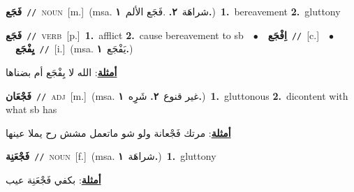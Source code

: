 \documentclass[10pt,a4paper,twoside]{article} %
\begin{document}
\begin{multicols}{2}
{\setlength\topsep{0pt}\textbf{\foreignlanguage{arabic}{فَجَع}}\ {\color{gray}\texttt{//}\color{black}}\ \textsc{noun}\ [m.]\ \color{gray}(msa. \foreignlanguage{arabic}{شراهَة}~\foreignlanguage{arabic}{\textbf{٢.}}  .\foreignlanguage{arabic}{فَجَع الألم}~\foreignlanguage{arabic}{\textbf{١.}})\color{black}\ \textbf{1.}~bereavement  \textbf{2.}~gluttony\ } \vspace{2mm}

{\setlength\topsep{0pt}\textbf{\foreignlanguage{arabic}{فَجَع}}\ {\color{gray}\texttt{//}\color{black}}\ \textsc{verb}\ [p.]\ \textbf{1.}~afflict  \textbf{2.}~cause bereavement to sb\ \ $\bullet$\ \ \setlength\topsep{0pt}\textbf{\foreignlanguage{arabic}{اِفْجَع}}\ {\color{gray}\texttt{//}\color{black}}\ [c.]\ \ $\bullet$\ \ \setlength\topsep{0pt}\textbf{\foreignlanguage{arabic}{يِفْجَع}}\ {\color{gray}\texttt{//}\color{black}}\ [i.]\ \color{gray}(msa. \foreignlanguage{arabic}{يَفْجَع}~\foreignlanguage{arabic}{\textbf{١.}})\color{black}\  \begin{flushright}\color{gray}\foreignlanguage{arabic}{\textbf{\underline{\foreignlanguage{arabic}{أمثلة}}}: الله لا يِفْجَع أم بضناها}\end{flushright}\color{black}} \vspace{2mm}

{\setlength\topsep{0pt}\textbf{\foreignlanguage{arabic}{فَجْعَان}}\ {\color{gray}\texttt{//}\color{black}}\ \textsc{adj}\ [m.]\ \color{gray}(msa. \foreignlanguage{arabic}{غير قنوع}~\foreignlanguage{arabic}{\textbf{٢.}}  \foreignlanguage{arabic}{شَرِِه}~\foreignlanguage{arabic}{\textbf{١.}})\color{black}\ \textbf{1.}~gluttonous  \textbf{2.}~dicontent with what sb has\  \begin{flushright}\color{gray}\foreignlanguage{arabic}{\textbf{\underline{\foreignlanguage{arabic}{أمثلة}}}: مرتك فَجْعانة ولو شو ماتعمل مشش رح يملا عينها}\end{flushright}\color{black}} \vspace{2mm}

{\setlength\topsep{0pt}\textbf{\foreignlanguage{arabic}{فَجْعَنِة}}\ {\color{gray}\texttt{//}\color{black}}\ \textsc{noun}\ [f.]\ \color{gray}(msa. \foreignlanguage{arabic}{شراهَة}~\foreignlanguage{arabic}{\textbf{١.}})\color{black}\ \textbf{1.}~gluttony\  \begin{flushright}\color{gray}\foreignlanguage{arabic}{\textbf{\underline{\foreignlanguage{arabic}{أمثلة}}}: بكفي فَجْعَنِة عيب}\end{flushright}\color{black}} \vspace{2mm}


\end{multicols}
\end{document}
